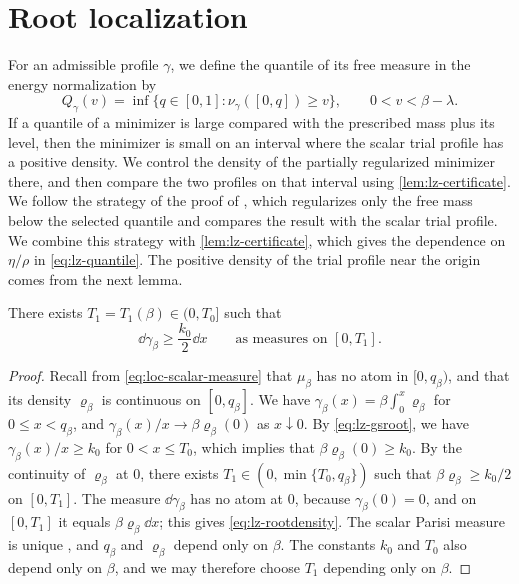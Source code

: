 \section{Root localization}\label{subsec:lz-quantile}

For an admissible profile $\gamma$, we define the quantile of its free measure
in the energy normalization by
\[
 Q_\gamma(v)=\inf\{q\in[0,1]:\nu_\gamma([0,q])\ge v\},
 \qquad 0<v<\beta-\lambda .
\]
If a quantile of a minimizer is large compared with the prescribed mass plus
its level, then the minimizer is small on an interval where the scalar trial
profile has a positive density. We control the density of the partially
regularized minimizer there, and then compare the two profiles on that
interval using \cref{lem:lz-certificate}. We follow the strategy of the proof
of \cite[Lemma~7.6]{AL}, which regularizes only the free mass below the
selected quantile and compares the result with the scalar trial profile. We
combine this strategy with \cref{lem:lz-certificate}, which gives the
dependence on $\eta/\rho$ in \eqref{eq:lz-quantile}. The positive density of
the trial profile near the origin comes from the next lemma.

\begin{lemma}\label{lem:lz-rootdensity}
There exists $T_1=T_1(\beta)\in(0,T_0]$ such that
\begin{equation}\label{eq:lz-rootdensity}
 \dd\gamma_\beta\ge\frac{k_0}2\dd x\qquad\text{as measures on }[0,T_1].
\end{equation}
\end{lemma}

\begin{proof}
Recall from \eqref{eq:loc-scalar-measure} that $\mu_\beta$ has no atom in
$[0,q_\beta)$, and that its density $\varrho_\beta$ is continuous on
$[0,q_\beta]$. We have $\gamma_\beta(x)=\beta\int_0^x\varrho_\beta$ for
$0\le x<q_\beta$, and $\gamma_\beta(x)/x\to\beta\varrho_\beta(0)$ as
$x\downarrow0$. By \eqref{eq:lz-gsroot}, we have $\gamma_\beta(x)/x\ge k_0$ for
$0<x\le T_0$, which implies that $\beta\varrho_\beta(0)\ge k_0$. By the
continuity of $\varrho_\beta$ at $0$, there exists
$T_1\in(0,\min\{T_0,q_\beta\})$ such that $\beta\varrho_\beta\ge k_0/2$ on
$[0,T_1]$. The measure $\dd\gamma_\beta$ has no atom at $0$, because
$\gamma_\beta(0)=0$, and on $[0,T_1]$ it equals $\beta\varrho_\beta\dd x$; this gives
\eqref{eq:lz-rootdensity}. The scalar Parisi measure is unique
\cite[Corollary~1]{AuffingerChen2015Uniqueness}, and $q_\beta$ and
$\varrho_\beta$ depend only on $\beta$. The constants $k_0$ and $T_0$ also
depend only on $\beta$, and we may therefore choose $T_1$ depending only on
$\beta$.
\end{proof}

